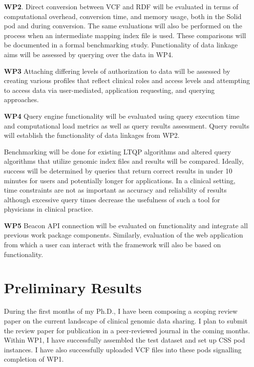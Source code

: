 \documentclass[runningheads]{llncs}
\begin{document}
\textbf{WP2}.
Direct conversion between VCF and RDF will be evaluated in terms of computational overhead, conversion time, and memory usage, both in the Solid pod and during conversion.
The same evaluations will also be performed on the process when an intermediate mapping index file is used. 
These comparisons will be documented in a formal benchmarking study.
Functionality of data linkage aims will be assessed by querying over the data in WP4.

\textbf{WP3}
Attaching differing levels of authorization to data will be assessed by creating various profiles that reflect clinical roles and access levels and attempting to access data via user-mediated, application requesting, and querying approaches. 

\textbf{WP4}
Query engine functionality will be evaluated using query execution time and computational load metrics as well as query results assessment. 
Query results will establish the functionality of data linkages from WP2.

Benchmarking will be done for existing LTQP algorithms and altered query algorithms that utilize genomic index files and results will be compared.
Ideally, success will be determined by queries that return correct results in under 10 minutes for users and potentially longer for applications.
In a clinical setting, time constraints are not as important as accuracy and reliability of results although excessive query times decrease the usefulness of such a tool for physicians in clinical practice.

\textbf{WP5}
Beacon API connection will be evaluated on functionality and integrate all previous work package components. 
Similarly, evaluation of the web application from which a user can interact with the framework will also be based on functionality.


\section{Preliminary Results}

During the first months of my Ph.D., I have been composing a scoping review paper on the current landscape of clinical genomic data sharing.
I plan to submit the review paper for publication in a peer-reviewed journal in the coming months.
Within WP1, I have successfully assembled the test dataset and set up CSS pod instances.
I have also successfully uploaded VCF files into these pods signalling completion of WP1. 
\end{document}
